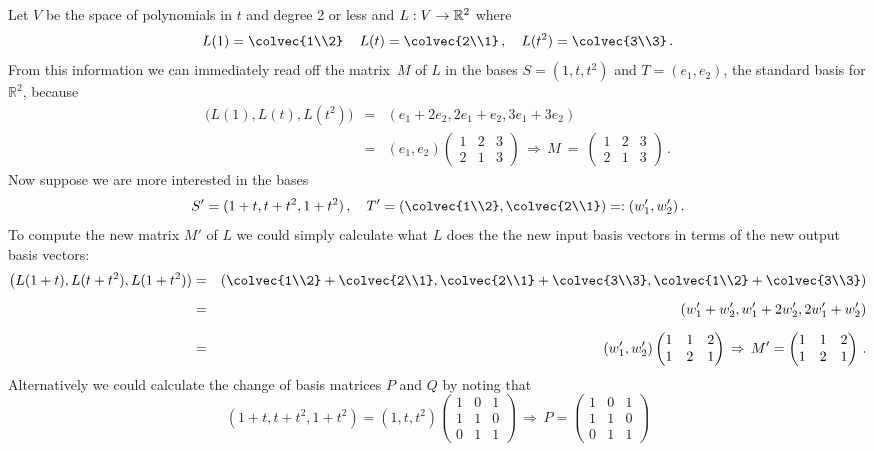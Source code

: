 \begin{example}
Let $V$ be the space of polynomials in $t$ and degree 2 or less and $\sloppy{L:V\to {\mathbb R}^2}$ where
\[
L(1)=\colvec{1\\2}\, \quad L(t)=\colvec{2\\1}\, ,\quad L(t^2)=\colvec{3\\3}\, .
\]
From this information we can immediately read off the matrix~$M$ of $L$ in the bases $S=(1,t,t^2)$ and $T=(e_1,e_2)$, the standard basis for ${\mathbb R}^2$,
because
\begin{eqnarray*}\big(L(1),L(t),L(t^2)\big)&=&(e_1+2 e_2,2e_1+e_2, 3 e_1+3e_2)\\[2mm]&=&(e_1,e_2)\begin{pmatrix}1&2&3\\2&1&3\end{pmatrix}\, \Rightarrow \, M\ =\ 
\begin{pmatrix}1&2&3\\2&1&3\end{pmatrix}\, .\end{eqnarray*}
Now suppose we are more interested in the bases \[S'=(1+t,t+t^2,1+t^2)\, , \quad T'=\left(\colvec{1\\2},\colvec{2\\1}\right)=:(w_1',w_2')\, .\]
To compute the new matrix $M'$ of $L$ we could simply calculate what $L$ does the the new input basis vectors in terms of the new output basis vectors:
\begin{eqnarray*}
\big(L(1+t),L(t+t^2),L(1+t^2))&=&\left(\colvec{1\\2}+\colvec{2\\1},
\colvec{2\\1}+\colvec{3\\3},\colvec{1\\2}+\colvec{3\\3}
\right)\\[2mm]
&=&(w'_1+w'_2,w'_1+2w'_2,2w'_1+w'_2)\\[2mm]&=&(w'_1,w'_2)
\begin{pmatrix}1&1&2\\1&2&1\end{pmatrix}\, \Rightarrow \, 
M'=\begin{pmatrix}1&1&2\\1&2&1\end{pmatrix}\, .
\end{eqnarray*}
Alternatively we could calculate the change of basis matrices $P$ and $Q$ by noting that
\[
(1+t,t+t^2,1+t^2)=(1,t,t^2)\begin{pmatrix}1&0&1\\1&1&0\\0&1&1\end{pmatrix}\, \Rightarrow\, P=\begin{pmatrix}1&0&1\\1&1&0\\0&1&1\end{pmatrix}
\]
\end{example}
